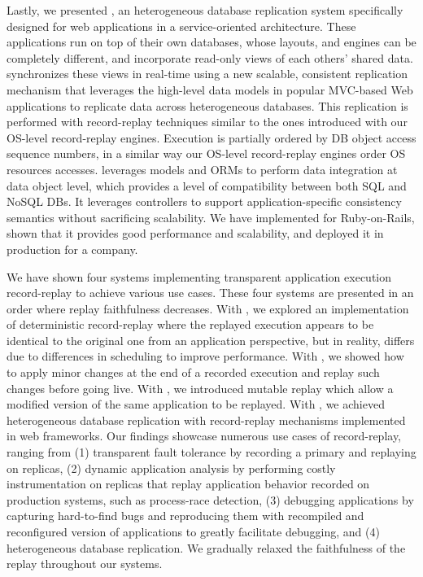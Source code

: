 Lastly, we presented \synapse, an heterogeneous database replication system
specifically designed for web applications in a service-oriented architecture.
These applications run on top of their own databases,
whose layouts, and engines can be completely different, and incorporate
read-only views of each others' shared data. \synapse synchronizes these views
in real-time using a new scalable, consistent replication mechanism that
leverages the high-level data models in popular MVC-based Web applications to
replicate data across heterogeneous databases.
This replication is performed with record-replay techniques similar to
the ones introduced with our OS-level record-replay engines.
Execution is partially ordered by DB object access sequence numbers,
in a similar way our OS-level record-replay engines order OS resources accesses.
\synapse leverages models and ORMs to perform data integration
at data object level, which provides a level of compatibility between both SQL
and NoSQL DBs. It leverages controllers to support application-specific
consistency semantics without sacrificing scalability.  We have implemented
\synapse for Ruby-on-Rails, shown that it provides good performance and
scalability, and deployed it in production for a company.

We have shown four systems implementing transparent application execution
record-replay to achieve various use cases. These four systems are presented
in an order where replay faithfulness decreases.
With \scribe, we explored an implementation of deterministic record-replay where
the replayed execution appears to be identical to the original one from an application
perspective, but in reality, differs due to differences in scheduling to improve performance.
With \racepro, we showed how to apply minor changes at the end of a
recorded execution and replay such changes before going live.
With \dora, we introduced mutable replay which allow a modified version
of the same application to be replayed.
With \synapse, we achieved heterogeneous database replication with
record-replay mechanisms implemented in web frameworks.
Our findings showcase numerous
use cases of record-replay, ranging from (1) transparent fault tolerance
by recording a primary and replaying on replicas, (2) dynamic application
analysis by performing costly instrumentation on replicas that replay
application behavior recorded on production systems, such as process-race
detection, (3) debugging applications by capturing hard-to-find bugs and
reproducing them with recompiled and reconfigured version of applications to
greatly facilitate debugging, and (4) heterogeneous database replication.
We gradually relaxed the faithfulness of the replay throughout our systems.


